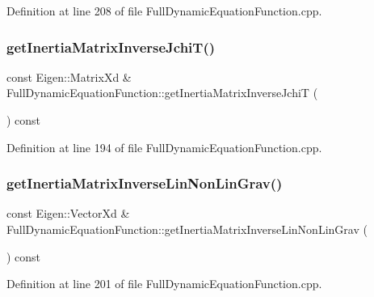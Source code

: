 Definition at line 208 of file Full\+Dynamic\+Equation\+Function.\+cpp.

\hypertarget{group__constraint_gaf2529ade8eb0c03afaaed34a4e82e144}{}\label{group__constraint_gaf2529ade8eb0c03afaaed34a4e82e144} 
\subsubsection{\texorpdfstring{get\+Inertia\+Matrix\+Inverse\+Jchi\+T()}{getInertiaMatrixInverseJchiT()}}
{\footnotesize\ttfamily const Eigen\+::\+Matrix\+Xd \& Full\+Dynamic\+Equation\+Function\+::get\+Inertia\+Matrix\+Inverse\+JchiT (\begin{DoxyParamCaption}{ }\end{DoxyParamCaption}) const}



Definition at line 194 of file Full\+Dynamic\+Equation\+Function.\+cpp.

\hypertarget{group__constraint_ga6d0c4ebdceec4ea4569266155ca41172}{}\label{group__constraint_ga6d0c4ebdceec4ea4569266155ca41172} 
\subsubsection{\texorpdfstring{get\+Inertia\+Matrix\+Inverse\+Lin\+Non\+Lin\+Grav()}{getInertiaMatrixInverseLinNonLinGrav()}}
{\footnotesize\ttfamily const Eigen\+::\+Vector\+Xd \& Full\+Dynamic\+Equation\+Function\+::get\+Inertia\+Matrix\+Inverse\+Lin\+Non\+Lin\+Grav (\begin{DoxyParamCaption}{ }\end{DoxyParamCaption}) const}



Definition at line 201 of file Full\+Dynamic\+Equation\+Function.\+cpp.

\hypertarget{group__constraint_ga673fd9a47a249d84ce527011a06417aa}{}\label{group__constraint_ga673fd9a47a249d84ce527011a06417aa} 

